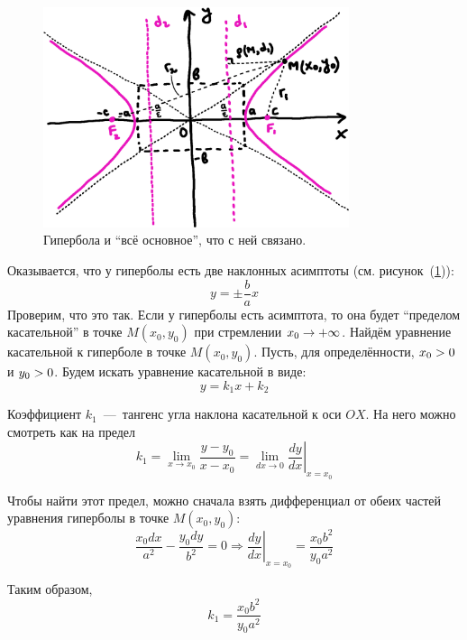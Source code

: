 \documentclass[a4paper,12pt]{article}
\begin{document}
  \begin{figure}[h]
    \centering
    
    \includegraphics[width=0.8\textwidth]{hyperbola}
    
    \caption{Гипербола и ``всё основное'', что с ней связано.}
    \label{fig:hyperbola}
  \end{figure}
  
  Оказывается, что у гиперболы есть две наклонных асимптоты (см. рисунок~(\ref{fig:hyperbola})):
  \[
    \boxed{
      y = \pm \frac{b}{a} x
    }
  \]
  Проверим, что это так.
  Если у гиперболы есть асимптота, то она будет ``пределом касательной'' в точке $M(x_0, y_0)$ при стремлении $x_0 \hm\to +\infty$.
  Найдём уравнение касательной к гиперболе в точке $M(x_0, y_0)$.
  Пусть, для определённости, $x_0 \hm> 0$ и $y_0 \hm> 0$.
  Будем искать уравнение касательной в виде:
  \[
    y = k_1 x + k_2
  \]

  Коэффициент $k_1$~---~тангенс угла наклона касательной к оси $OX$.
  На него можно смотреть как на предел
  \[
    k_1 = \lim_{x \to x_0} \frac{y - y_0}{x - x_0} = \lim_{dx \to 0} \left.\frac{dy}{dx}\right|_{x=x_0}
  \]
  
  Чтобы найти этот предел, можно сначала взять дифференциал от обеих частей уравнения гиперболы в точке $M(x_0, y_0)$:
  \[
    \frac{x_0 dx}{a^2} - \frac{y_0 dy}{b^2} = 0 \Rightarrow \left.\frac{dy}{dx}\right|_{x=x_0} = \frac{x_0 b^2}{y_0 a^2}
  \]
  
  Таким образом,
  \[
    k_1 = \frac{x_0 b^2}{y_0 a^2}
  \]
  
\end{document}
